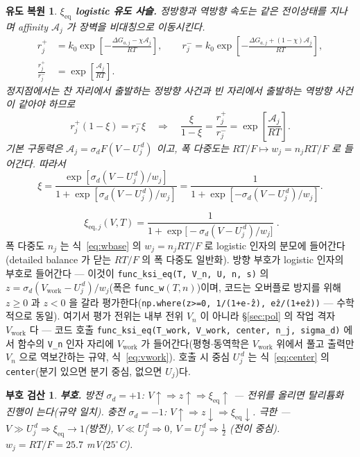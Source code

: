\documentclass[11pt,a4paper]{article}
\newtheorem*{signbox}{부호 검산}
\newtheorem*{derivebox}{유도 복원}
\newcommand{\eq}{\mathrm{eq}}
\newcommand{\work}{\mathrm{work}}
\newcommand{\code}[1]{\texttt{#1}}
\begin{document}
\begin{derivebox}
\textbf{$\xi_{\eq}$ logistic 유도 사슬.} 정방향과 역방향 속도는 같은 전이상태를 지나며 affinity $\mathcal A_j$ 가 장벽을 비대칭으로 이동시킨다.
\begin{align*}
r_j^+&=k_0\exp\!\left[-\frac{\Delta G_{a,j}-\chi\mathcal A_j}{RT}\right],\qquad
r_j^-=k_0\exp\!\left[-\frac{\Delta G_{a,j}+(1-\chi)\mathcal A_j}{RT}\right],\\
\frac{r_j^+}{r_j^-}&=\exp\!\left[\frac{\mathcal A_j}{RT}\right].
\end{align*}
정지점에서는 찬 자리에서 출발하는 정방향 사건과 빈 자리에서 출발하는 역방향 사건이 같아야 하므로
\begin{equation*}
r_j^+(1-\xi)=r_j^-\xi
\quad\Longrightarrow\quad
\frac{\xi}{1-\xi}=\frac{r_j^+}{r_j^-}=\exp\!\left[\frac{\mathcal A_j}{RT}\right].
\end{equation*}
기본 구동력은 $\mathcal A_j=\sigma_d F(V-U_j^{\,d})$ 이고, 폭 다중도는 $RT/F\mapsto w_j=n_jRT/F$ 로 들어간다. 따라서
\begin{equation*}
\xi=\frac{\exp[\sigma_d(V-U_j^{\,d})/w_j]}{1+\exp[\sigma_d(V-U_j^{\,d})/w_j]}
=\frac{1}{1+\exp[-\sigma_d(V-U_j^{\,d})/w_j]}.
\end{equation*}
\end{derivebox}

\begin{equation}
\boxed{\;\xi_{\eq,j}(V,T)=\frac{1}{1+\exp\!\big[-\sigma_d(V-U_j^{\,d})/w_j\big]}\;.}
\label{eq:xieq}
\end{equation}
폭 다중도 $n_j$ 는 식~\eqref{eq:wbase} 의 $w_j=n_jRT/F$ 로 logistic 인자의 분모에 들어간다(detailed balance 가 닫는 $RT/F$ 의 폭 다중도 일반화). 방향 부호가 logistic 인자의 부호로 들어간다 — 이것이 \code{func\_ksi\_eq(T, V\_n, U, n, s)} 의
$z=\sigma_d(V_\work-U_j^{\,d})/w_j$(폭은 \code{func\_w}$(T,n)$)이며, 코드는 오버플로 방지를 위해 $z\ge0$ 과 $z<0$ 을
갈라 평가한다(\code{np.where(z>=0, 1/(1+e\^{-z}), e\^{z}/(1+e\^{z}))} — 수학적으로 동일). 여기서 평가 전위는
내부 전위 $V_n$ 이 아니라 \S\ref{sec:pol} 의 작업 격자 $V_\work$ 다 — 코드 호출 \code{func\_ksi\_eq(T\_work,
V\_work, center, n\_j, sigma\_d)} 에서 함수의 \code{V\_n} 인자 자리에 $V_\work$ 가 들어간다(평형$\cdot$동역학은
$V_\work$ 위에서 풀고 출력만 $V_n$ 으로 역보간하는 규약, 식~\eqref{eq:vwork}). 호출 시 중심 $U_j^{\,d}$ 는
식~\eqref{eq:center} 의 \code{center}(분기 있으면 분기 중심, 없으면 $U_j$)다.

\begin{signbox}
\textbf{부호.} 방전 $\sigma_d=+1$: $V\!\uparrow\Rightarrow z\!\uparrow\Rightarrow\xi_\eq\!\uparrow$ — 전위를 올리면
탈리튬화 진행이 는다(규약 일치). 충전 $\sigma_d=-1$: $V\!\uparrow\Rightarrow z\!\downarrow\Rightarrow\xi_\eq\!\downarrow$.
극한 — $V\gg U_j^{\,d}\Rightarrow\xi_\eq\to1$(방전), $V\ll U_j^{\,d}\Rightarrow0$, $V=U_j^{\,d}\Rightarrow\tfrac12$
(전이 중심). $w_j=RT/F=25.7$ mV($25^\circ$C).
\end{signbox}
\end{document}
